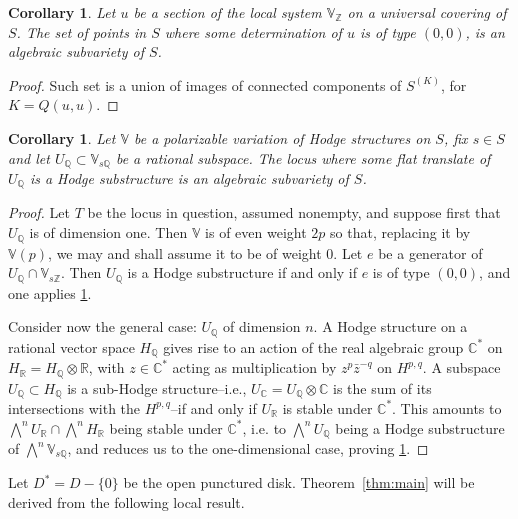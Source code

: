 \documentclass[11pt,a4paper]{article}
\theoremstyle{plain}
\newtheorem{corollary}[theorem]{Corollary}
\theoremstyle{definition}
\begin{document}
\begin{corollary}\label{cor:section}
Let $u$ be a section of the local system $\mathbb{V}_{\mathbb{Z}}$ on a universal covering of $S$. The set of points in $S$ where some determination of $u$ is of type $(0,0)$, is an algebraic subvariety of $S$.
\end{corollary}

\begin{proof}
Such set is a union of images of connected components of $S^{(K)}$, for $K=Q(u,u)$.
\end{proof}

\begin{corollary}\label{cor:hodgesub}
Let $\mathbb{V}$ be a polarizable variation of Hodge structures on $S$, fix $s\in S$ and let $U_{\mathbb{Q}}\subset \mathbb{V}_{s\mathbb{Q}}$ be a rational subspace. The locus where some flat translate of $U_{\mathbb{Q}}$ is a Hodge substructure is an algebraic subvariety of $S$.
\end{corollary}

\begin{proof}
Let $T$ be the locus in question, assumed nonempty, and suppose first that $U_{\mathbb{Q}}$ is of dimension one. Then $\mathbb{V}$ is of even weight $2p$ so that, replacing it by $\mathbb{V}(p)$, we may and shall assume it to be of weight $0$. Let $e$ be a generator of $U_{\mathbb{Q}}\cap \mathbb{V}_{s\mathbb{Z}}$. Then $U_{\mathbb{Q}}$ is a Hodge substructure if and only if $e$ is of type $(0,0)$, and one applies \ref{cor:section}.

Consider now the general case: $U_{\mathbb{Q}}$ of dimension $n$. A Hodge structure on a rational vector space $H_{\mathbb{Q}}$ gives rise to an action of the real algebraic group $\mathbb{C}^*$ on $H_{\mathbb{R}}=H_{\mathbb{Q}}\otimes\mathbb{R}$, with $z\in\mathbb{C}^*$ acting as multiplication by $z^p\bar{z}^{-q}$ on $H^{p,q}$. A subspace $U_{\mathbb{Q}}\subset H_{\mathbb{Q}}$ is a sub-Hodge structure--i.e., $U_{\mathbb{C}}=U_{\mathbb{Q}}\otimes\mathbb{C}$ is the sum of its intersections with the $H^{p,q}$--if and only if $U_{\mathbb{R}}$ is stable under $\mathbb{C}^*$. This amounts to $\bigwedge^n U_{\mathbb{R}}\cap\bigwedge^n H_{\mathbb{R}}$ being stable under $\mathbb{C}^*$, i.e. to $\bigwedge^n U_{\mathbb{Q}}$ being a Hodge substructure of $\bigwedge^n\mathbb{V}_{s\mathbb{Q}}$, and reduces us to the one-dimensional case, proving \ref{cor:hodgesub}.
\end{proof}

Let $D^*=D-\{0\}$ be the open punctured disk. Theorem~\ref{thm:main} will be derived from the following local result.
\end{document}
